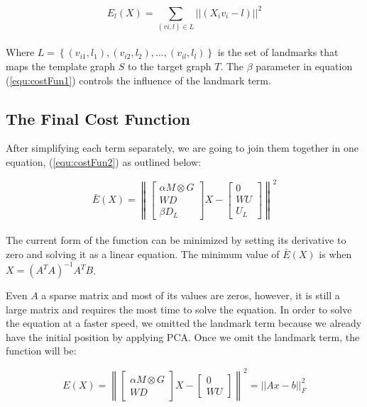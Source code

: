 \documentclass[../structure.tex]{subfiles}
\begin{document}
\begin{equation}
E_{l}(X) = \sum_{(vi,l) \in L}||(X_{i}v_{i} - l)||^2
\label{equ:landmark1}
\end{equation}\\

Where $L = \left\{(v_{i1},l_{1}),(v_{i2},l_{2}),...,(v_{il},l_{l})\right\}$ is the set of landmarks that maps the template graph $S$ to the target graph $T$. The $\beta$ parameter in equation (\ref{equ:costFun1}) controls the influence of the landmark term.

\subsection{The Final Cost Function}
After simplifying each term separately, we are going to join them together in one equation, (\ref{equ:costFun2}) as outlined below:

\begin{equation}
\bar{E}(X) = \left\|
\begin{bmatrix}
\alpha M \otimes G \\ WD \\ \beta D_{L}
\end{bmatrix}
X -
\begin{bmatrix}
0 \\ WU \\ U_{L}
\end{bmatrix}
\right\| ^2
\label{equ:costFun2}
\end{equation}\\

The current form of the function can be minimized by setting its derivative to zero and solving it as a linear equation. The minimum value of $\bar{E}(X)$ is when $X = (A^T A)^{-1} A^T B$.

Even $A$ a sparse matrix and most of its values are zeros, however, it is still a large matrix and requires the most time to solve the equation. In order to solve the equation at a faster speed, we omitted the landmark term because we already have the initial position by applying PCA. Once we omit the landmark term, the function will be:

\begin{equation}
E(X) = \left\|
\begin{bmatrix}
\alpha M \otimes G \\ WD
\end{bmatrix}
X -
\begin{bmatrix}
0 \\ WU
\end{bmatrix}
\right\| ^2
= ||Ax - b||_{F}^2
\label{equ:costFun3}
\end{equation}\\
\end{document}
